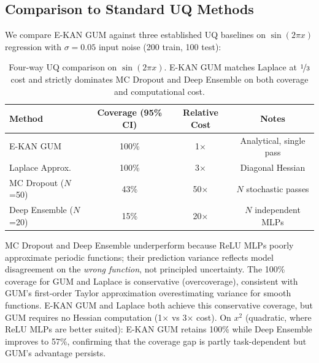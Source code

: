 \documentclass{article}
\begin{document}
%

\subsection{Comparison to Standard UQ Methods}
\label{sec:uq-baselines}

We compare E-KAN GUM against three established UQ baselines on $\sin(2\pi x)$ regression with $\sigma=0.05$ input noise (200 train, 100 test):

\begin{table}[t]
\centering
\caption{Four-way UQ comparison on $\sin(2\pi x)$.  E-KAN GUM matches Laplace at $\nicefrac{1}{3}$ cost and strictly dominates MC Dropout and Deep Ensemble on both coverage and computational cost.}
\label{tab:uq-baselines}
\begin{tabular}{@{}lccc@{}}
\toprule
\textbf{Method} & \textbf{Coverage (95\% CI)} & \textbf{Relative Cost} & \textbf{Notes} \\
\midrule
E-KAN GUM & 100\% & 1$\times$ & Analytical, single pass \\
Laplace Approx. & 100\% & 3$\times$ & Diagonal Hessian \\
MC Dropout ($N$=50) & 43\% & 50$\times$ & $N$ stochastic passes \\
Deep Ensemble ($N$=20) & 15\% & 20$\times$ & $N$ independent MLPs \\
\bottomrule
\end{tabular}
\end{table}

MC Dropout and Deep Ensemble underperform because ReLU MLPs poorly approximate periodic functions; their prediction variance reflects model disagreement on the \emph{wrong function}, not principled uncertainty.
The 100\% coverage for GUM and Laplace is conservative (overcoverage), consistent with GUM's first-order Taylor approximation overestimating variance for smooth functions.
E-KAN GUM and Laplace both achieve this conservative coverage, but GUM requires no Hessian computation (1$\times$ vs 3$\times$ cost).
On $x^2$ (quadratic, where ReLU MLPs are better suited): E-KAN GUM retains 100\% while Deep Ensemble improves to 57\%, confirming that the coverage gap is partly task-dependent but GUM's advantage persists.
\end{document}
